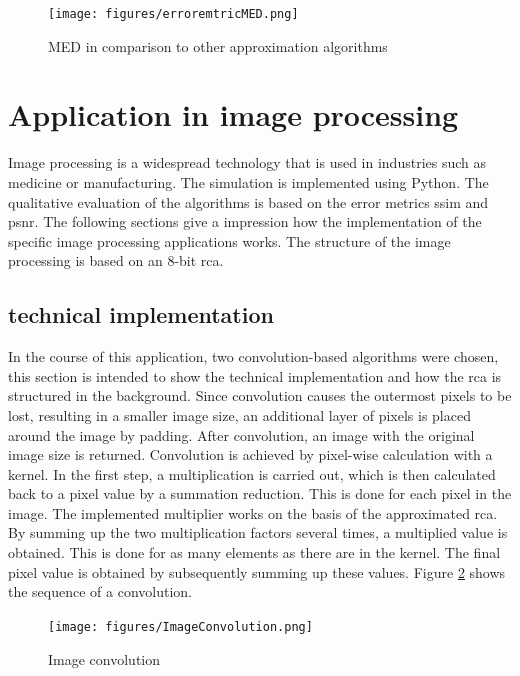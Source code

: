 \documentclass[]{IEEEtran}
\begin{document}
\begin{figure}[h]
	\centering
	\texttt{[image: figures/erroremtricMED.png]}
	\caption{\gls{MED} in comparison to other approximation algorithms}
	\label{fig:MED comparison}
\end{figure}

\newpage

\section{Application in image processing}
\label{ch:APPIMAGE}
Image processing is a widespread technology that is used in industries such as medicine or manufacturing. The simulation is implemented using Python. The qualitative evaluation of the algorithms is based on the error metrics \gls{ssim} and \gls{psnr}. The following sections give a impression how the implementation of the specific image processing applications works. The structure of the image processing is based on an 8-bit \gls{rca}.

\subsection{technical implementation}
In the course of this application, two convolution-based algorithms were chosen, this section is intended to show the technical implementation and how the \gls{rca} is structured in the background. Since convolution causes the outermost pixels to be lost, resulting in a smaller image size, an additional layer of pixels is placed around the image by padding. After convolution, an image with the original image size is returned. Convolution is achieved by pixel-wise calculation with a kernel. In the first step, a multiplication is carried out, which is then calculated back to a pixel value by a summation reduction. This is done for each pixel in the image. The implemented multiplier works on the basis of the approximated \gls{rca}. By summing up the two multiplication factors several times, a multiplied value is obtained. This is done for as many elements as there are in the kernel. The final pixel value is obtained by subsequently summing up these values. Figure \ref{fig:image convolution} shows the sequence of a convolution.

\begin{figure}[h]
	\centering
	\texttt{[image: figures/ImageConvolution.png]}
	\caption{Image convolution \cite{fpgabasedCnovolution}}
	\label{fig:image convolution}
\end{figure}
\end{document}
